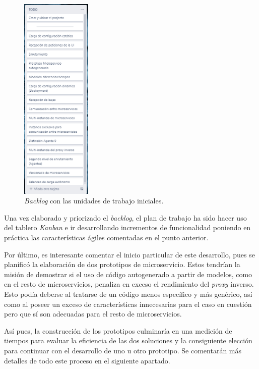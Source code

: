 \documentclass[11pt,spanish,listoffigures]{tfgetsinf}
\begin{document}
\begin{figure}[ht]
\centering
\includegraphics[width=0.3\textwidth]{imagenes/backlogInicial}
\caption{\emph{Backlog} con las unidades de trabajo iniciales.}
	\label{kanbanInicial}
\end{figure}

Una vez elaborado y priorizado el \emph{backlog}, el plan de trabajo ha sido hacer uso del tablero \emph{Kanban} e ir desarrollando incrementos de funcionalidad poniendo en práctica las características ágiles comentadas en el punto anterior.

Por último, es interesante comentar el inicio particular de este desarrollo, pues se planificó la elaboración de dos prototipos de microservicio. Estos tendrían la misión de demostrar si el uso de código autogenerado a partir de modelos, como en el resto de microservicios, penaliza en exceso el rendimiento del \emph{proxy} inverso. Esto podía deberse al tratarse de un código menos específico y más genérico, así como al poseer un exceso de características innecesarias para el caso en cuestión pero que sí son adecuadas para el resto de microservicios.

Así pues, la construcción de los prototipos culminaría en una medición de tiempos para evaluar la eficiencia de las dos soluciones y la consiguiente elección para continuar con el desarrollo de uno u otro prototipo. Se comentarán más detalles de todo este proceso en el siguiente apartado.
\end{document}
